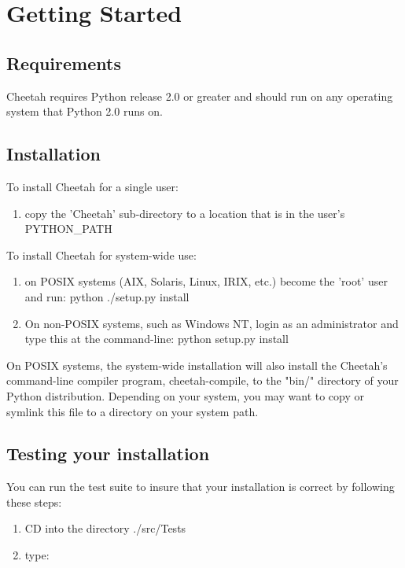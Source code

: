 \section{Getting Started}
\label{gettingStarted}

\subsection{Requirements}
Cheetah requires Python release 2.0 or greater and should run on any
operating system that Python 2.0 runs on.

\subsection{Installation}

To install Cheetah for a single user:
\begin{enumerate}
\item copy the 'Cheetah' sub-directory  to a location that is in the user's
     PYTHON_PATH
\end{enumerate}

To install Cheetah for system-wide use:
\begin{enumerate}
\item on POSIX systems (AIX, Solaris, Linux, IRIX, etc.) become the 'root' user
     and run: python ./setup.py install
     
\item On non-POSIX systems, such as Windows NT, login as an administrator and
     type this at the command-line:  python setup.py install
\end{enumerate}


On POSIX systems, the system-wide installation will also install the Cheetah's
command-line compiler program, cheetah-compile, to the "bin/" directory of your
Python distribution.  Depending on your system, you may want to copy or symlink
this file to a directory on your system path.

\subsection{Testing your installation}
You can run the test suite to insure that your installation is correct by
following these steps:
\begin{enumerate}
\item CD into the directory ./src/Tests   
\item type:  
\end{enumerate}

